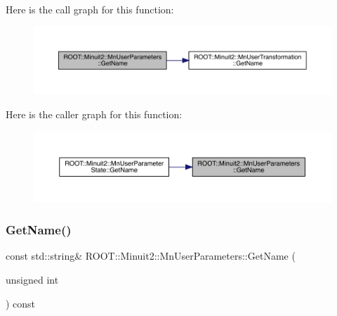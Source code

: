 Here is the call graph for this function\+:\nopagebreak
\begin{figure}[H]
\begin{center}
\leavevmode
\includegraphics[width=350pt]{d6/d10/classROOT_1_1Minuit2_1_1MnUserParameters_a83594fef03edc5f0948e05a290e67fc2_cgraph}
\end{center}
\end{figure}
Here is the caller graph for this function\+:\nopagebreak
\begin{figure}[H]
\begin{center}
\leavevmode
\includegraphics[width=350pt]{d6/d10/classROOT_1_1Minuit2_1_1MnUserParameters_a83594fef03edc5f0948e05a290e67fc2_icgraph}
\end{center}
\end{figure}
\mbox{\label{classROOT_1_1Minuit2_1_1MnUserParameters_a6061d066b67d33c98eb6d9ba36b8e269}} 
\subsubsection{\texorpdfstring{GetName()}{GetName()}\hspace{0.1cm}{\footnotesize\ttfamily [2/2]}}
{\footnotesize\ttfamily const std\+::string\& R\+O\+O\+T\+::\+Minuit2\+::\+Mn\+User\+Parameters\+::\+Get\+Name (\begin{DoxyParamCaption}\item[{unsigned int}]{ }\end{DoxyParamCaption}) const}

\mbox{\label{classROOT_1_1Minuit2_1_1MnUserParameters_a30523af61ec1c817b0eb060d560f9a95}} 
